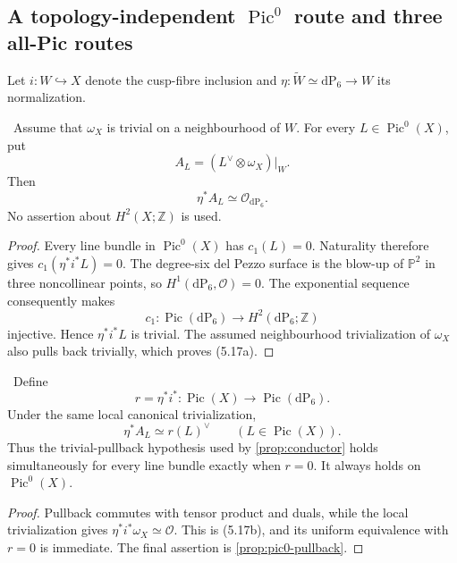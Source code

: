 \subsection{A topology-independent \texorpdfstring{$\operatorname{Pic}^0$}{Pic0} route and three all-Pic routes}

Let $i:W\hookrightarrow X$ denote the cusp-fibre inclusion and
$\eta:\widetilde W\simeq\mathrm{dP}_6\to W$ its normalization.

\begin{proposition}
\label{prop:pic0-pullback}
\Verified\ Assume that $\omega_X$ is trivial on a neighbourhood of $W$.
For every $L\in\operatorname{Pic}^0(X)$, put
\[
 A_L=(L^\vee\otimes\omega_X)|_W.
\]
Then
\[
 \eta^*A_L\simeq\mathcal O_{\mathrm{dP}_6}.
\tag{5.17a}
\]
No assertion about $H^2(X;\mathbb Z)$ is used.
\end{proposition}

\begin{proof}
Every line bundle in $\operatorname{Pic}^0(X)$ has $c_1(L)=0$.  Naturality
therefore gives $c_1(\eta^*i^*L)=0$.  The degree-six del Pezzo surface is the
blow-up of $\mathbb P^2$ in three noncollinear points, so
$H^1(\mathrm{dP}_6,\mathcal O)=0$.  The exponential sequence consequently
makes
\[
 c_1:\operatorname{Pic}(\mathrm{dP}_6)\longrightarrow
 H^2(\mathrm{dP}_6;\mathbb Z)
\]
injective.  Hence $\eta^*i^*L$ is trivial.  The assumed neighbourhood
trivialization of $\omega_X$ also pulls back trivially, which proves
(5.17a).
\end{proof}

\begin{proposition}
\label{prop:all-pic-restriction}
\Verified\ Define
\[
 r=\eta^*i^*:\operatorname{Pic}(X)\longrightarrow
 \operatorname{Pic}(\mathrm{dP}_6).
\]
Under the same local canonical trivialization,
\[
 \eta^*A_L\simeq r(L)^\vee
 \qquad(L\in\operatorname{Pic}(X)).
\tag{5.17b}
\]
Thus the trivial-pullback hypothesis used by
\cref{prop:conductor} holds simultaneously for every line bundle exactly
when $r=0$.  It always holds on $\operatorname{Pic}^0(X)$.
\end{proposition}

\begin{proof}
Pullback commutes with tensor product and duals, while the local
trivialization gives $\eta^*i^*\omega_X\simeq\mathcal O$.  This is (5.17b),
and its uniform equivalence with $r=0$ is immediate.  The final assertion is
\cref{prop:pic0-pullback}.
\end{proof}

